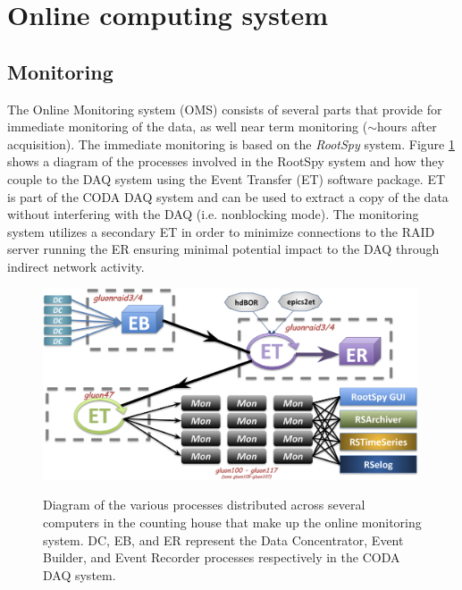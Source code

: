 
\section[Online computing system]{Online computing system \label{sec:online}}
\subsection{Monitoring \label{sec:onlinemonitoring}}

The Online Monitoring system (OMS) consists of several parts that provide for immediate monitoring of the data, as well near term monitoring ($\sim$hours after acquisition). The immediate monitoring is based on the \textit{RootSpy} system. Figure \ref{fig:online_monitoring_processes} shows a diagram of the processes involved in the RootSpy system and how they couple to the DAQ system using the Event Transfer (ET) software package. ET is part of the CODA DAQ system\cite{coda} and can be used to extract a copy of the data without interfering with the DAQ (i.e. nonblocking mode). The monitoring system utilizes a secondary ET in order to minimize connections to the RAID server running the ER ensuring minimal potential impact to the DAQ through indirect network activity.

\begin{figure}[tbp]
\begin{center}
\includegraphics[width=0.99\textwidth]{figures/online_monitoring_processes.png}
\label{fig:online_monitoring_processes}
\caption{Diagram of the various processes distributed across several computers in the counting house that make up the online monitoring system. DC, EB, and ER represent the Data Concentrator, Event Builder, and Event Recorder processes respectively in the CODA DAQ system.}   
\end{center}  
\end{figure}

